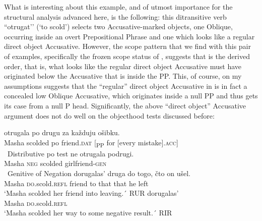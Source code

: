 \documentclass[output=paper,colorlinks,citecolor=brown,nonflat]{./langscibook}
\begin{document}
What is interesting about this example, and of utmost importance for the structural analysis advanced here, is the following: this ditransitive verb “otrugat’’ (‘to scold’) selects two Accusative-marked objects, one Oblique, occurring inside an overt Prepositional Phrase and one which looks like a regular direct object Accusative. However, the scope pattern that we find with this pair of examples, specifically the frozen scope status of , suggests that  is the {derived} order, that is, what looks like the regular direct object Accusative must have originated below the Accusative that is inside the PP. This, of course, on my assumptions suggests that the “regular” direct object Accusative in  is in fact a concealed low Oblique Accusative, which originates inside a null PP and thus gets its case from a null P head. Significantly, the above “direct object” Accusative argument does not do well on the objecthood tests discussed before:


\ea%
    \label{ex:antonyuk:55}
    \ea \label{ex:antonyuk:55a}
      {otrugala} {po} {drugu} {} {za} {každuju}             {ošibku}.\\
    Masha scolded  po friend.\textsc{dat} [\textsubscript{PP} for [every mistake].\textsc{acc}]\\
    \glt ~\hfill{Distributive po test}
    \ex \label{ex:antonyuk:55b}
        {ne}    {otrugala} {podrugi}.\\
    Masha \textsc{neg} scolded   girlfriend-\textsc{gen}\\
    \glt ~\hfill{Genitive of Negation}
    \ex \label{ex:antonyuk:55c}
        {dorugalas’}         {druga} {do} {togo,} {čto}  {on} {ušel}.\\
    Masha  \textsc{do}.scold.\textsc{refl} friend to  that  that  he left\\
    \glt `Masha scolded her friend into leaving.´ \hfill{RUR}
    \ex \label{ex:antonyuk:55d}
        {dorugalas’}\\
    Masha  \textsc{do}.scold.\textsc{refl}\\
    \glt `Masha scolded her way to some negative result.´ \hfill{RIR} \citep{Tatevosov2010}
    \z
\z
\end{document}
